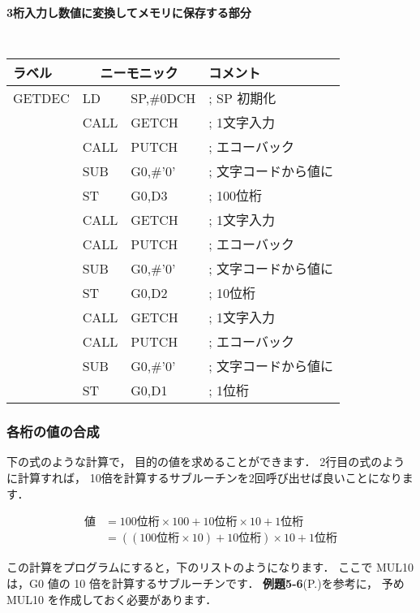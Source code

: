 \begin{center}
{\bf 3桁入力し数値に変換してメモリに保存する部分}
{\small\tt
\begin{tabular}{|l|l l l|} \hline
ラベル & \multicolumn{2}{|c}{ニーモニック} & コメント    \\
\hline
GETDEC & LD   & SP,\#0DCH        & ; SP 初期化           \\
       & CALL & GETCH            & ; 1文字入力           \\
       & CALL & PUTCH            & ; エコーバック        \\
       & SUB  & G0,\#'0'         & ; 文字コードから値に  \\
       & ST   & G0,D3            & ; 100位桁             \\
       & CALL & GETCH            & ; 1文字入力           \\
       & CALL & PUTCH            & ; エコーバック        \\
       & SUB  & G0,\#'0'         & ; 文字コードから値に  \\
       & ST   & G0,D2            & ; 10位桁              \\
       & CALL & GETCH            & ; 1文字入力           \\
       & CALL & PUTCH            & ; エコーバック        \\
       & SUB  & G0,\#'0'         & ; 文字コードから値に  \\
       & ST   & G0,D1            & ; 1位桁               \\
\hline
\end{tabular}
}
\end{center}


\subsubsection{各桁の値の合成}

下の式のような計算で，
目的の値を求めることができます．
2行目の式のように計算すれば，
10倍を計算するサブルーチンを2回呼び出せば良いことになります．

\begin{eqnarray}
値 & = 100位桁 \times 100 + 10位桁 \times 10 + 1位桁 \nonumber\\
   & = ((100位桁 \times 10) + 10位桁) \times 10 + 1位桁 \nonumber
\end{eqnarray}

この計算をプログラムにすると，下のリストのようになります．
ここで MUL10 は，G0 値の 10 倍を計算するサブルーチンです．
{\bf 例題5-6}(P.\pageref{rei:5_6})を参考に，
予め MUL10 を作成しておく必要があります．

